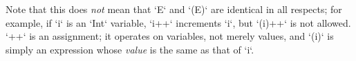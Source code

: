 Note that this does {\em
not} mean that \xcd`E` and \xcd`(E)` are identical in all respects; for
example, if \xcd`i` is an \xcd`Int` variable, \xcd`i++` increments \xcd`i`,
but \xcd`(i)++` is not allowed.    \xcd`++` is an assignment; it operates on
variables, not merely values, and \xcd`(i)` is simply an expression whose {\em
value} is the same as that of \xcd`i`. 
